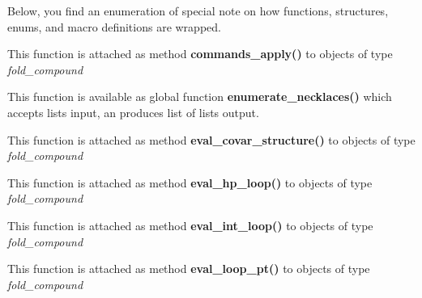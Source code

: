 Below, you find an enumeration of special note on how functions, structures, enums, and macro definitions are wrapped.


\begin{DoxyRefList}
\item[\label{wrappers__wrappers000003}%
\hypertarget{wrappers__wrappers000003}{}%
Global \hyperlink{commands_8h_a5e993fc4b9602af73aaaab4d3b3cd9a9}{vrna\+\_\+commands\+\_\+apply} (vrna\+\_\+fold\+\_\+compound\+\_\+t $\ast$vc, vrna\+\_\+cmd\+\_\+t $\ast$commands, unsigned int options)]This function is attached as method {\bfseries commands\+\_\+apply()} to objects of type {\itshape fold\+\_\+compound}  
\item[\label{wrappers__wrappers000001}%
\hypertarget{wrappers__wrappers000001}{}%
Global \hyperlink{group__utils_gae081ac655a76bd5c4b3d86c60b096b75}{vrna\+\_\+enumerate\+\_\+necklaces} (const unsigned int $\ast$type\+\_\+counts)]This function is available as global function {\bfseries enumerate\+\_\+necklaces()} which accepts lists input, an produces list of lists output.  
\item[\label{wrappers__wrappers000027}%
\hypertarget{wrappers__wrappers000027}{}%
Global \hyperlink{group__eval_ga6cea75c0eb9857fb59172be54cab09e0}{vrna\+\_\+eval\+\_\+covar\+\_\+structure} (vrna\+\_\+fold\+\_\+compound\+\_\+t $\ast$vc, const char $\ast$structure)]This function is attached as method {\bfseries eval\+\_\+covar\+\_\+structure()} to objects of type {\itshape fold\+\_\+compound}  
\item[\label{wrappers__wrappers000031}%
\hypertarget{wrappers__wrappers000031}{}%
Global \hyperlink{group__loops_gab3eb4651dc26dc2b653a57dd340d7e68}{vrna\+\_\+eval\+\_\+hp\+\_\+loop} (vrna\+\_\+fold\+\_\+compound\+\_\+t $\ast$vc, int i, int j)]This function is attached as method {\bfseries eval\+\_\+hp\+\_\+loop()} to objects of type {\itshape fold\+\_\+compound}  
\item[\label{wrappers__wrappers000032}%
\hypertarget{wrappers__wrappers000032}{}%
Global \hyperlink{group__loops_ga018f1314dbbae42fdd27c94670b61721}{vrna\+\_\+eval\+\_\+int\+\_\+loop} (vrna\+\_\+fold\+\_\+compound\+\_\+t $\ast$vc, int i, int j, int k, int l)]This function is attached as method {\bfseries eval\+\_\+int\+\_\+loop()} to objects of type {\itshape fold\+\_\+compound}  
\item[\label{wrappers__wrappers000028}%
\hypertarget{wrappers__wrappers000028}{}%
Global \hyperlink{group__eval_ga730ba4df55c02fd530a0cddd49faf760}{vrna\+\_\+eval\+\_\+loop\+\_\+pt} (vrna\+\_\+fold\+\_\+compound\+\_\+t $\ast$vc, int i, const short $\ast$pt)]This function is attached as method {\bfseries eval\+\_\+loop\+\_\+pt()} to objects of type {\itshape fold\+\_\+compound}  

\end{DoxyRefList}
